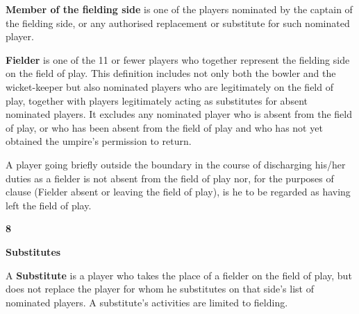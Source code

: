 \documentclass[12pt]{article}
\begin{document}
\vspace{\baselineskip}
\begin{adjustwidth}{0.4in}{0.44in}
{\fontsize{9pt}{10.8pt} \tabto{0.39in} \textbf{Member of the fielding side }is one of the players nominated by the captain of the fielding side, or any\textbf{ }authorised replacement or substitute for such nominated player.\par}\par

\end{adjustwidth}


\vspace{\baselineskip}
\begin{adjustwidth}{0.4in}{0.12in}
{\fontsize{9pt}{10.8pt} \tabto{0.39in} \textbf{Fielder }is one of the 11 or fewer players who together represent the fielding side on the field of play. This\textbf{ }definition includes not only both the bowler and the wicket-keeper but also nominated players who are legitimately on the field of play, together with players legitimately acting as substitutes for absent nominated players. It excludes any nominated player who is absent from the field of play, or who has been absent from the field of play and who has not yet obtained the umpire’s permission to return.\par}\par

\end{adjustwidth}


\vspace{\baselineskip}
\begin{adjustwidth}{0.49in}{0.07in}
{\fontsize{9pt}{10.8pt}\selectfont A player going briefly outside the boundary in the course of discharging his/her duties as a fielder is not absent from the field of play nor, for the purposes of clause (Fielder absent or leaving the field of play), is he to be regarded as having left the field of play.\par}\par

\end{adjustwidth}


\vspace{\baselineskip}
{\fontsize{16pt}{19.2pt}\selectfont \textbf{8 \tabto{0.29in} }{\fontsize{15pt}{18.0pt}\selectfont \textbf{Substitutes}\par}\par}\par


\vspace{\baselineskip}
\begin{adjustwidth}{0.4in}{0.04in}
{\fontsize{9pt}{10.8pt} \tabto{0.39in} A \textbf{Substitute} is a player who takes the place of a fielder on the field of play, but does not replace the player for whom he substitutes on that side’s list of nominated players. A substitute’s activities are limited to fielding.\par}\par

\end{adjustwidth}
\end{document}
